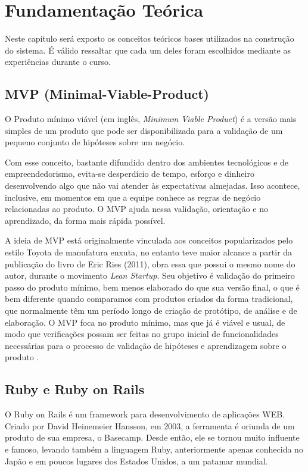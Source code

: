 \chapter{Fundamentação Teórica}

Neste capítulo será exposto os conceitos teóricos bases utilizados na construção do sistema. É válido ressaltar que cada um deles foram escolhidos mediante as experiências durante o curso.

\section{MVP (Minimal-Viable-Product)}

O Produto mínimo viável (em inglês, \textit{Minimum Viable Product}) é a versão mais simples de um produto que pode ser disponibilizada para a validação de um pequeno conjunto de hipóteses sobre um negócio. 

Com esse conceito, bastante difundido dentro dos ambientes tecnológicos e de empreendedorismo, evita-se desperdício de tempo, esforço e dinheiro desenvolvendo algo que não vai atender às expectativas almejadas. Isso acontece, inclusive, em momentos em que a equipe conhece as regras de negócio relacionadas ao produto. O MVP ajuda nessa validação, orientação e no aprendizado, da forma mais rápida possível.

A ideia de MVP está originalmente vinculada aos conceitos popularizados pelo estilo Toyota de manufatura enxuta, no entanto teve maior alcance a partir da publicação do livro de Eric Ries (2011), obra essa que possui o mesmo nome do autor, durante o movimento \textit{Lean Startup}. Seu objetivo é validação do primeiro passo do produto mínimo, bem menos elaborado do que sua versão final, o que é bem diferente quando comparamos com produtos criados da forma tradicional, que normalmente têm um período longo de criação de protótipo, de análise e de elaboração. O MVP foca no produto mínimo, mas que já é viável e usual, de modo que verificações possam ser feitas no grupo inicial de funcionalidades necessárias para o processo de validação de hipóteses e aprendizagem sobre o produto .

\section{Ruby e Ruby on Rails}

O Ruby on Rails é um framework para desenvolvimento de aplicações WEB. Criado por David Heinemeier Hansson, em 2003, a ferramenta é oriunda de um produto de sua empresa, o Basecamp. Desde então, ele se tornou muito influente e famoso, levando também a linguagem Ruby, anteriormente apenas conhecida no Japão e em poucos lugares dos Estados Unidos, a um patamar mundial.

